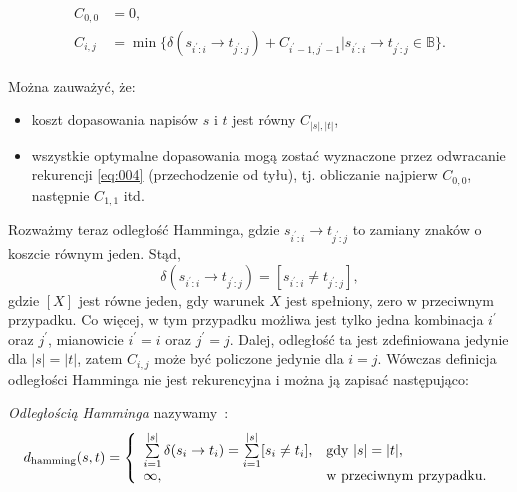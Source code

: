 \documentclass{praca1}
\begin{document}
\begin{align}
\begin{split}
\label{eq:004}
C_{0,0} &= 0, \\
C_{i,j} &= \min\{\delta(s_{i^\prime:i}\rightarrow t_{j^\prime:j}) + C_{i^\prime-1, j^\prime-1} | s_{i^\prime:i}\rightarrow t_{j^\prime:j} \in \mathbb{B}\}.
\end{split}
\end{align}

Można zauważyć, że:
\begin{itemize}
\item koszt dopasowania napisów $s$ i $t$ jest równy $C_{|s|, |t|}$,
\item wszystkie optymalne dopasowania mogą zostać wyznaczone przez odwracanie rekurencji \eqref{eq:004} (przechodzenie od tyłu), tj. obliczanie najpierw $C_{0,0}$, następnie $C_{1,1}$ itd.
\end{itemize}




Rozważmy teraz odległość Hamminga, gdzie $s_{i^\prime:i}\rightarrow t_{j^\prime:j}$ to zamiany znaków o koszcie równym jeden. Stąd,
\begin{equation}
\label{eq:005}
\delta(s_{i^\prime:i}\rightarrow t_{j^\prime:j}) = [s_{i^\prime:i}\neq t_{j^\prime:j}],
\end{equation}
gdzie $[X]$ jest równe jeden, gdy warunek $X$ jest spełniony, zero w przeciwnym przypadku. Co więcej, w tym przypadku możliwa jest tylko jedna kombinacja $i^\prime$ oraz $j^\prime$, mianowicie $i^\prime = i$ oraz $j^\prime = j$. Dalej, odległość ta jest zdefiniowana jedynie dla $|s| = |t|$, zatem $C_{i,j}$ może być policzone jedynie dla $i = j$. Wówczas definicja odległości Hamminga nie jest rekurencyjna i można ją zapisać następująco:


\begin{definition}
\emph{Odległością Hamminga} nazywamy~\cite{Hamming1950:errordetecting}:
$$
d_{\mathrm{hamming}}(s, t) = \left\{
\begin{array}{l l}     
    \sum\limits_{i=1}^{|s|}\delta(s_i \rightarrow t_i) = \sum\limits_{i=1}^{|s|}[s_i\neq t_i], & \text{gdy } |s| = |t|,\\
    \infty, & \text{w przeciwnym przypadku}.
\end{array}\right.
$$
\end{definition}
\end{document}
